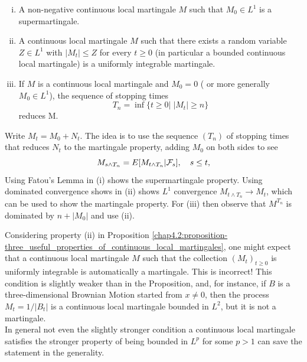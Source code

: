 \begin{proposition} 
\label{chap4.2:proposition-three_useful_properties_of_continuous_local_martingales}
\begin{enumerate}[(i)]
    \item A non-negative continuous local martingale $M$ such that $M_0 \in L^1$ is a supermartingale.
    \item A continuous local martingale $M$ such that there exists a random variable $Z \in L^1$ with $|M_t| \leq Z$ for every $t \geq 0$ (in particular a bounded continuous local martingale) is a uniformly integrable martingale.
    \item If $M$ is a continuous local martingale and $M_0=0$ ( or more generally $M_0 \in L^1$), the sequence of stopping times
    $$T_n = \inf\{t \geq 0 | \;|M_t| \geq n\}$$
    reduces M.
\end{enumerate}
\end{proposition}
\begin{proofidea}
Write $M_t=M_0+N_t$. The idea is to use the sequence $(T_n)$ of stopping times that reduces $N_t$ to the martingale property, adding $M_0$ on both sides to see
$$M_{s \land T_n}=E[M_{t \land T_n}| \mathcal{F}_s], \quad s \leq t,$$
Using Fatou's Lemma in (i) shows the supermartingale property. Using dominated convergence shows in (ii) shows $L^1$ convergence $M_{t \land T_n} \to M_t$, which can be used to show the martingale property. 
For (iii) then observe that $M^{T_n}$ is dominated by $n+|M_0|$ and use (ii).
\end{proofidea}
\begin{trap}
Considering property (ii) in Proposition \ref{chap4.2:proposition-three_useful_properties_of_continuous_local_martingales}, one might expect that a continuous local martingale $M$ such that the collection $(M_t)_{t\geq 0}$ is uniformly integrable is automatically a martingale. This is incorrect! This condition is slightly weaker than in the Proposition, and, for instance, if $B$ is a three-dimensional Brownian Motion started from $x\neq 0$, then the process $M_t=1/|B_t|$ is a continuous local martingale bounded in $L^2$, but it is not a martingale. \\
In general not even the slightly stronger condition a continuous local martingale satisfies the stronger property of being bounded in $L^p$ for some $p>1$ can save the statement in the generality.
\end{trap}

